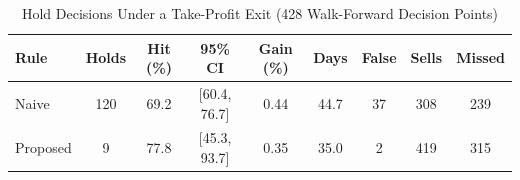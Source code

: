 \begin{table}[!t]
\caption{Hold Decisions Under a Take-Profit Exit (428 Walk-Forward Decision Points)}
\label{tab:decisions}
\centering
\footnotesize
\setlength{\tabcolsep}{2.5pt}
\begin{tabular}{lcccccccc}
\hline
Rule & Holds & Hit (\%) & 95\% CI & Gain (\%) & Days & False & Sells & Missed \\
\hline
Naive & 120 & 69.2 & [60.4, 76.7] & 0.44 & 44.7 & 37 & 308 & 239 \\
Proposed & 9 & 77.8 & [45.3, 93.7] & 0.35 & 35.0 & 2 & 419 & 315 \\
\hline
\end{tabular}
\end{table}
